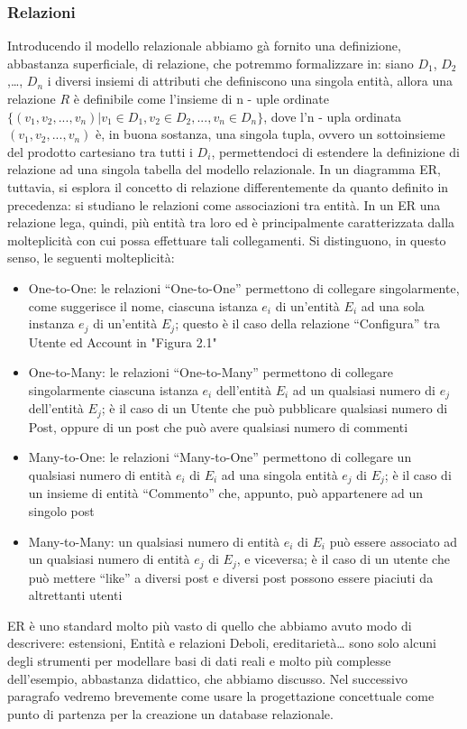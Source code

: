 \documentclass[a4paper,12pt]{report}
\begin{document}
\subsubsection{Relazioni}
Introducendo il modello relazionale abbiamo gà fornito una definizione, abbastanza superficiale, di relazione, che potremmo formalizzare in:  siano $D_1$, $D_2$,…, $D_n$ i diversi insiemi di attributi che definiscono una singola entità, allora una relazione $R$ è definibile come l’insieme di n - uple ordinate $\{(v_1,v_2,...,v_n)|v_1\in D_1,v_2\in D_2,...,v_n \in D_n\}$, dove l’n - upla ordinata $(v_1,v_2,...,v_n)$ è, in buona sostanza, una singola tupla, ovvero un sottoinsieme del prodotto cartesiano tra tutti i $D_i$, permettendoci di estendere la definizione di relazione ad una singola tabella del modello relazionale. In un diagramma ER, tuttavia, si esplora il concetto di relazione differentemente da quanto definito in precedenza: si studiano le relazioni come associazioni tra entità. In un ER una relazione lega, quindi, più entità tra loro ed è principalmente caratterizzata dalla molteplicità con cui possa effettuare tali collegamenti.
Si distinguono, in questo senso, le seguenti molteplicità:
\begin{itemize}
    \item One-to-One: le relazioni “One-to-One” permettono di collegare singolarmente, come suggerisce il nome,  ciascuna istanza $e_i$  di un’entità $E_i$ ad una sola instanza $e_j$ di un’entità $E_j$; questo è il caso della relazione “Configura” tra Utente ed Account in "Figura 2.1"
    \item One-to-Many:  le relazioni “One-to-Many” permettono di collegare singolarmente ciascuna istanza $e_i$ dell’entità $E_i$ ad un qualsiasi numero di $e_j$ dell’entità $E_j$; è il caso di un Utente che può pubblicare qualsiasi numero di Post, oppure di un post che può avere qualsiasi numero di commenti
    \item Many-to-One: le relazioni “Many-to-One” permettono di collegare un qualsiasi numero di entità $e_i$ di $E_i$ ad una singola entità $e_j$ di $E_j$; è il caso di un insieme di entità “Commento” che, appunto, può appartenere ad un singolo post
    \item Many-to-Many:  un qualsiasi numero di entità $e_i$ di $E_i$ può essere associato ad un qualsiasi numero di entità $e_j$ di $E_j$, e viceversa; è il caso di un utente che può mettere “like” a diversi post e diversi post possono essere piaciuti da altrettanti utenti
    
\end{itemize}
\noindent
ER è uno standard molto più vasto di quello che abbiamo avuto modo di descrivere: estensioni, Entità e relazioni Deboli, ereditarietà… sono solo alcuni degli strumenti per modellare basi di dati reali e molto più complesse dell’esempio, abbastanza didattico, che abbiamo discusso. Nel successivo paragrafo vedremo brevemente come usare la progettazione concettuale come punto di partenza per la creazione un database relazionale.
\end{document}
